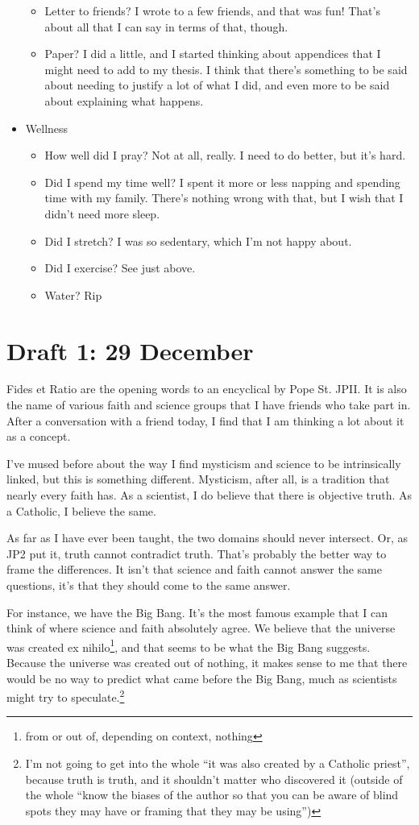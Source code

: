 \documentclass[12pt]{article}[titlepage]
\newcommand{\say}[1]{``#1''}
\newcommand{\1}{\={a}}
\newcommand{\2}{\={e}}
\newcommand{\3}{\={\i}}
\newcommand{\4}{\=o}
\newcommand{\5}{\=u}
\newcommand{\6}{\={A}}
\renewcommand{\,}{\textsuperscript{,}}
\begin{document}
\begin{itemize}
\begin{itemize}
\item Letter to friends? I wrote to a few friends, and that was fun! That's about all that I can say in terms of that, though.
\item Paper? I did a little, and I started thinking about appendices that I might need to add to my thesis. I think that there's something to be said about needing to justify a lot of what I did, and even more to be said about explaining what happens.
\end{itemize}
\item Wellness
\begin{itemize}
\item How well did I pray? Not at all, really. I need to do better, but it's hard.
\item Did I spend my time well? I spent it more or less napping and spending time with my family. There's nothing wrong with that, but I wish that I didn't need more sleep.
\item Did I stretch? I was so sedentary, which I'm not happy about.
\item Did I exercise? See just above.
\item Water? Rip
\end{itemize}
\end{itemize}

\section{Draft 1: 29 December}
Fides et Ratio are the opening words to an encyclical by Pope St. JPII.
It is also the name of various faith and science groups that I have friends who take part in.
After a conversation with a friend today, I find that I am thinking a lot about it as a concept.

I've mused before about the way I find mysticism and science to be intrinsically linked, but this is something different.
Mysticism, after all, is a tradition that nearly every faith has.
As a scientist, I do believe that there is objective truth.
As a Catholic, I believe the same.

As far as I have ever been taught, the two domains should never intersect.
Or, as JP2 put it, truth cannot contradict truth.
That's probably the better way to frame the differences.
It isn't that science and faith cannot answer the same questions, it's that they should come to the same answer.

For instance, we have the Big Bang.
It's the most famous example that I can think of where science and faith absolutely agree.
We believe that the universe was created ex nihilo\footnote{from or out of, depending on context, nothing}, and that seems to be what the Big Bang suggests.
Because the universe was created out of nothing, it makes sense to me that there would be no way to predict what came before the Big Bang, much as scientists might try to speculate.\footnote{I'm not going to get into the whole \say{it was also created by a Catholic priest}, because truth is truth, and it shouldn't matter who discovered it (outside of the whole \say{know the biases of the author so that you can be aware of blind spots they may have or framing that they may be using})}
\end{document}

